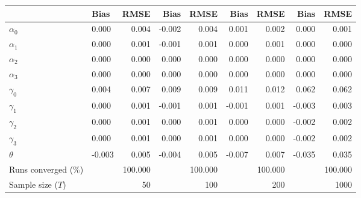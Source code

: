 
\begin{tabular}[t]{llrrrrrrr}
\toprule
  & Bias & RMSE & Bias & RMSE & Bias & RMSE & Bias & RMSE\\
\midrule
$\alpha_{0}$ & 0.000 & 0.004 & -0.002 & 0.004 & 0.001 & 0.002 & 0.000 & 0.001\\
$\alpha_{1}$ & 0.000 & 0.001 & -0.001 & 0.001 & 0.000 & 0.001 & 0.000 & 0.000\\
$\alpha_{2}$ & 0.000 & 0.000 & 0.000 & 0.000 & 0.000 & 0.000 & 0.000 & 0.000\\
$\alpha_{3}$ & 0.000 & 0.000 & 0.000 & 0.000 & 0.000 & 0.000 & 0.000 & 0.000\\
$\gamma_{0}$ & 0.004 & 0.007 & 0.009 & 0.009 & 0.011 & 0.012 & 0.062 & 0.062\\
$\gamma_{1}$ & 0.000 & 0.001 & -0.001 & 0.001 & -0.001 & 0.001 & -0.003 & 0.003\\
$\gamma_{2}$ & 0.000 & 0.001 & 0.000 & 0.001 & 0.000 & 0.000 & -0.002 & 0.002\\
$\gamma_{3}$ & 0.000 & 0.001 & 0.000 & 0.001 & 0.000 & 0.000 & -0.002 & 0.002\\
$\theta$ & -0.003 & 0.005 & -0.004 & 0.005 & -0.007 & 0.007 & -0.035 & 0.035\\
Runs converged (\%) &  & 100.000 &  & 100.000 &  & 100.000 &  & 100.000\\
Sample size ($T$) &  & 50 &  & 100 &  & 200 &  & 1000\\
\bottomrule
\end{tabular}
